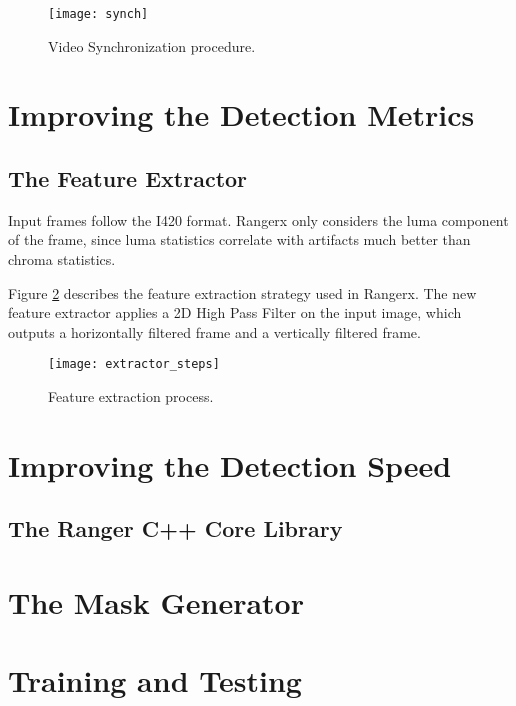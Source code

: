 \begin{figure} [!h]
  \centering
  
  \texttt{[image: synch]}
  
  \caption{Video Synchronization procedure.}
  \label{fig:synch}

\end{figure}



\section{Improving the Detection Metrics}
\label{sec:sol_metrics}

\subsection{The Feature Extractor}
\label{sec:sol_features}

Input frames follow the I420 format. Rangerx only considers the luma component of the frame, since luma statistics correlate with artifacts much better than chroma statistics.

Figure \ref{fig:extractor_steps} describes the feature extraction strategy used in Rangerx. The new feature extractor applies a 2D High Pass Filter on the input image, which outputs a horizontally filtered frame and a vertically filtered frame.

\begin{figure} [!h]
  \centering
  
  \texttt{[image: extractor\_steps]}
  
  \caption{Feature extraction process. }
  \label{fig:extractor_steps}

\end{figure}

\section{Improving the Detection Speed}
\label{sec:sol_speed}

\subsection{The Ranger C++ Core Library}
\label{sec:sol_rdf}

\section{The Mask Generator}
\label{sec:sol_maskgen}

\section{Training and Testing}
\label{sec:sol_traintest}


